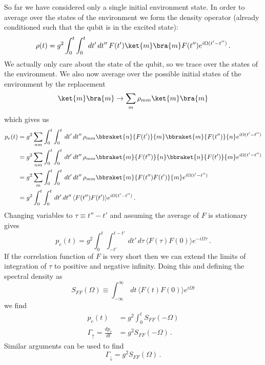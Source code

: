 So far we have considered only a single initial environment state.
In order to average over the states of the environment we form the density operator (already conditioned such that the qubit is in the excited state):
\begin{equation}
\rho(t) = g^2 \int_0^t \int_0^t \, dt' \, dt'' \, F(t')\ket{m}\bra{m}F(t'') e^{i \Omega (t'-t'')} \, .
\end{equation}
We actually only care about the state of the qubit, so we trace over the states of the environment.
We also now average over the possible initial states of the environment by the replacement
\begin{displaymath}
\ket{m}\bra{m} \rightarrow \sum_m \rho_{mm} \ket{m}\bra{m}
\end{displaymath}
which gives us
\begin{align}
p_e(t)
&= g^2 \sum_{nm} \int_0^t \int_0^t \, dt' \, dt'' \, \rho_{mm} \bbraket{n}{F(t')}{m} \bbraket{m}{F(t'')}{n} e^{i \Omega (t' - t'')} \\
&= g^2 \sum_{nm} \int_0^t \int_0^t \, dt' \, dt'' \, \rho_{mm} \bbraket{m}{F(t'')}{n} \bbraket{n}{F(t')}{m} e^{i \Omega (t' - t'')} \\
&= g^2 \sum_m \int_0^t \int_0^t \, dt' \, dt'' \, \rho_{mm} \bbraket{m}{F(t'') F(t')}{m} e^{i \Omega (t' - t'')} \\
&= g^2 \int_0^t \int_0^t \, dt' \, dt'' \, \langle F(t'') F(t') \rangle e^{i \Omega (t' - t'')} \, .
\end{align}
Changing variables to $\tau \equiv t'' - t'$ and assuming the average of $F$ is stationary gives
\begin{equation}
p_e(t)
= g^2 \int_0^t \int_{-t'}^{t-t'} \, dt' \, d\tau \, \langle F(\tau) F(0) \rangle e^{-i \Omega \tau} \, .
\end{equation}
If the correlation function of $F$ is very short then we can extend the limits of integration of $\tau$ to positive and negative infinity.
Doing this and defining the spectral density as
\begin{equation}
S_{FF}(\Omega) \equiv \int_{-\infty}^\infty \, dt \, \langle F(t) F(0) \rangle e^{i \Omega t}
\end{equation}
we find
\begin{align}
p_e(t) 
&= g^2 \int_0^t S_{FF}(-\Omega) \\
\Gamma_{\uparrow} = \frac{dp_e}{dt} &= g^2 S_{FF}(-\Omega) \, .
\end{align}
Similar arguments can be used to find
\begin{equation}
\Gamma_\downarrow = g^2 S_{FF}(\Omega) \, . \label{eq:ch.decoherence.sec.noise_from_a_quantum_environment:gamma_down}
\end{equation}
